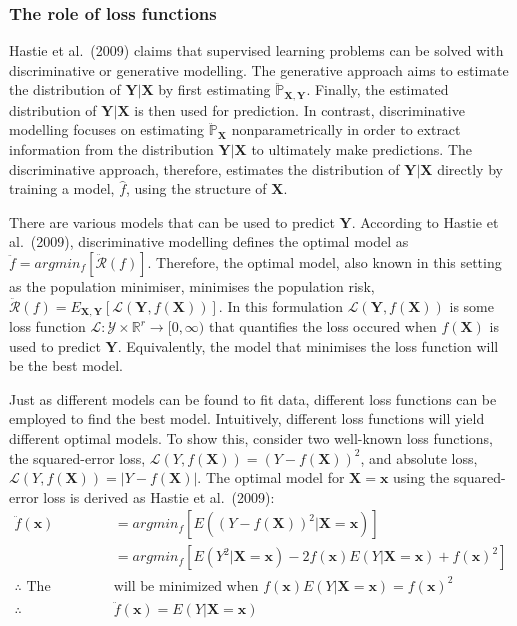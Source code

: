 \documentclass[11pt]{article}
\begin{document}
    \subsubsection{The role of loss
functions}\label{the-role-of-loss-functions}

Hastie et al.~(2009) claims that supervised learning problems can be
solved with discriminative or generative modelling. The generative
approach aims to estimate the distribution of \(\mathbf{Y}|\mathbf{X}\)
by first estimating \(\ddot{\mathbb{P}}_{\mathbf{X,Y}}\). Finally, the
estimated distribution of \(\mathbf{Y}|\mathbf{X}\) is then used for
prediction. In contrast, discriminative modelling focuses on estimating
\(\ddot{\mathbb{P}}_{\mathbf{X}}\) nonparametrically in order to extract
information from the distribution \(\mathbf{Y}|\mathbf{X}\) to
ultimately make predictions. The discriminative approach, therefore,
estimates the distribution of \(\mathbf{Y}|\mathbf{X}\) directly by
training a model, \(\hat{f}\), using the structure of \(\mathbf{X}\).

There are various models that can be used to predict \(\mathbf{Y}\).
According to Hastie et al.~(2009), discriminative modelling defines the
optimal model as \(\ddot{f}=argmin_{f}[\ddot{\mathcal{R}}(f)]\).
Therefore, the optimal model, also known in this setting as the
population minimiser, minimises the population risk,
\(\ddot{\mathcal{R}}(f)=E_{\mathbf{X, Y}}[\mathcal{L}(\mathbf{Y},f(\mathbf{X}))]\).
In this formulation \(\mathcal{L}(\mathbf{Y},f(\mathbf{X}))\) is some
loss function
\(\mathcal{L}:\mathcal{Y}\times\mathbb{R}^r\rightarrow[0,\infty)\) that
quantifies the loss occured when \(f(\mathbf{X})\) is used to predict
\(\mathbf{Y}\). Equivalently, the model that minimises the loss function
will be the best model.

Just as different models can be found to fit data, different loss
functions can be employed to find the best model. Intuitively, different
loss functions will yield different optimal models. To show this,
consider two well-known loss functions, the squared-error loss,
\(\mathcal{L}(Y,f(\mathbf{X}))=(Y-f(\mathbf{X}))^2\), and absolute loss,
\(\mathcal{L}(Y,f(\mathbf{X}))=|Y-f(\mathbf{X})|\). The optimal model
for \(\mathbf{X}=\mathbf{x}\) using the squared-error loss is derived as
Hastie et al.~(2009):
\begin{align*}
  \ddot{f}(\mathbf{x})&=argmin_{f}[E((Y-f(\mathbf{X}))^2|\mathbf{X}=\mathbf{x})] \\
  &=argmin_{f}[E{(Y^2|\mathbf{X}=\mathbf{x})-2f(\mathbf{x})E(Y|\mathbf{X}=\mathbf{x})+f(\mathbf{x})^2}] \\
\therefore \text{ The expression }&\text{will be minimized when } f(\mathbf{x})E(Y|\mathbf{X}=\mathbf{x})=f(\mathbf{x})^2 \\
\therefore& \ddot{f}(\mathbf{x})= E(Y|\mathbf{X}=\mathbf{x}) \\
\end{align*}
\end{document}
